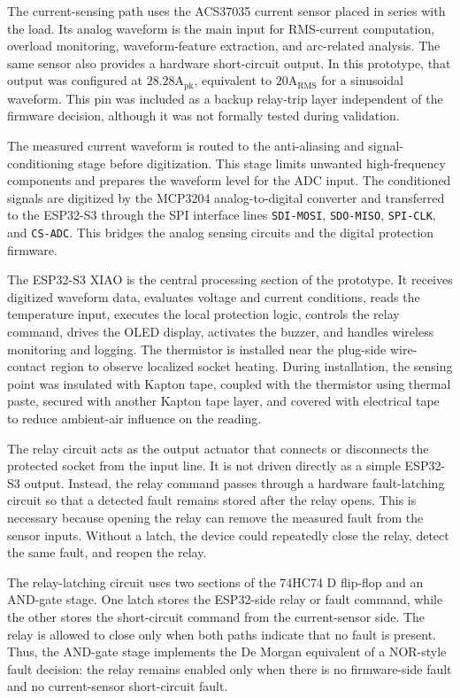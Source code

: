 The current-sensing path uses the ACS37035 current sensor placed in series with
the load. Its analog waveform is the main input for RMS-current computation,
overload monitoring, waveform-feature extraction, and arc-related analysis. The
same sensor also provides a hardware short-circuit output. In this prototype,
that output was configured at $28.28\mathrm{A}_{\mathrm{pk}}$, equivalent to
$20\mathrm{A}_{\mathrm{RMS}}$ for a sinusoidal waveform. This pin was included
as a backup relay-trip layer independent of the firmware decision, although it
was not formally tested during validation.

The measured current waveform is routed to the anti-aliasing and
signal-conditioning stage before digitization. This stage limits unwanted
high-frequency components and prepares the waveform level for the ADC input.
The conditioned signals are digitized by the MCP3204 analog-to-digital
converter and transferred to the ESP32-S3 through the SPI interface lines
\texttt{SDI-MOSI}, \texttt{SDO-MISO}, \texttt{SPI-CLK}, and \texttt{CS-ADC}.
This bridges the analog sensing circuits and the digital protection firmware.

The ESP32-S3 XIAO is the central processing section of the prototype. It
receives digitized waveform data, evaluates voltage and current conditions,
reads the temperature input, executes the local protection logic, controls the
relay command, drives the OLED display, activates the buzzer, and handles
wireless monitoring and logging. The thermistor is installed near the plug-side
wire-contact region to observe localized socket heating. During installation,
the sensing point was insulated with Kapton tape, coupled with the thermistor 
using thermal paste, secured with another Kapton tape layer, and covered 
with electrical tape to reduce ambient-air influence on the reading.

The relay circuit acts as the output actuator that connects or disconnects the
protected socket from the input line. It is not driven directly as a simple
ESP32-S3 output. Instead, the relay command passes through a hardware
fault-latching circuit so that a detected fault remains stored after the relay
opens. This is necessary because opening the relay can remove the measured
fault from the sensor inputs. Without a latch, the device could repeatedly
close the relay, detect the same fault, and reopen the relay.

The relay-latching circuit uses two sections of the 74HC74 D flip-flop and an
AND-gate stage. One latch stores the ESP32-side relay or fault command, while
the other stores the short-circuit command from the current-sensor side. The
relay is allowed to close only when both paths indicate that no fault is
present. Thus, the AND-gate stage implements the De Morgan equivalent of a
NOR-style fault decision: the relay remains enabled only when there is no
firmware-side fault and no current-sensor short-circuit fault.

